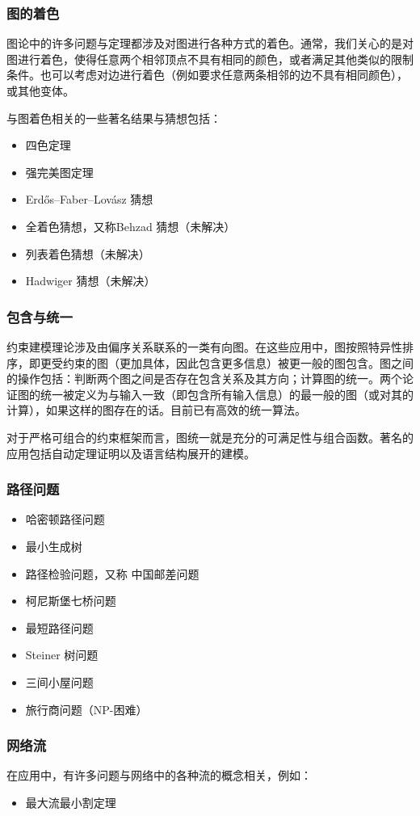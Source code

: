 \subsubsection{图的着色}
图论中的许多问题与定理都涉及对图进行各种方式的着色。通常，我们关心的是对图进行着色，使得任意两个相邻顶点不具有相同的颜色，或者满足其他类似的限制条件。也可以考虑对边进行着色（例如要求任意两条相邻的边不具有相同颜色），或其他变体。

与图着色相关的一些著名结果与猜想包括：
\begin{itemize}
\item 四色定理
\item 强完美图定理
\item Erdős–Faber–Lovász 猜想
\item 全着色猜想，又称Behzad 猜想（未解决）
\item 列表着色猜想（未解决）
\item Hadwiger 猜想（未解决）
\end{itemize}
\subsubsection{包含与统一}
约束建模理论涉及由偏序关系联系的一类有向图。在这些应用中，图按照特异性排序，即更受约束的图（更加具体，因此包含更多信息）被更一般的图包含。图之间的操作包括：判断两个图之间是否存在包含关系及其方向；计算图的统一。两个论证图的统一被定义为与输入一致（即包含所有输入信息）的最一般的图（或对其的计算），如果这样的图存在的话。目前已有高效的统一算法。

对于严格可组合的约束框架而言，图统一就是充分的可满足性与组合函数。著名的应用包括自动定理证明以及语言结构展开的建模。
\subsubsection{路径问题}
\begin{itemize}
\item 哈密顿路径问题
\item 最小生成树
\item 路径检验问题，又称 中国邮差问题
\item 柯尼斯堡七桥问题
\item 最短路径问题
\item Steiner 树问题
\item 三间小屋问题
\item 旅行商问题（NP-困难）
\end{itemize}
\subsubsection{网络流}
在应用中，有许多问题与网络中的各种流的概念相关，例如：
\begin{itemize}
\item 最大流最小割定理
\end{itemize}
